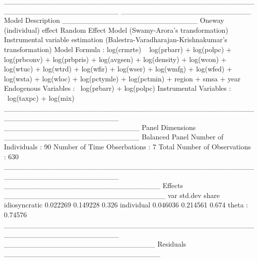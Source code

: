 \documentclass{article}
\begin{document}
\begin{Schunk}
\begin{Soutput}
______________________________________________________________________ 
_________________________ Model Description __________________________
Oneway (individual) effect
Random Effect Model (Swamy-Arora's transformation)
Instrumental variable estimation (Balestra-Varadharajan-Krishnakumar's transformation)
Model Formula             : log(crmrte) ~ log(prbarr) + log(polpc) + 
                                log(prbconv) + log(prbpris) + 
                                log(avgsen) + log(density) + 
                                log(wcon) + log(wtuc) + log(wtrd) + 
                                log(wfir) + log(wser) + log(wmfg) + 
                                log(wfed) + log(wsta) + log(wloc) + 
                                log(pctymle) + log(pctmin) + 
                                region + smsa + year
Endogenous Variables    : ~log(prbarr) + log(polpc)
Instrumental Variables    : ~log(taxpc) + log(mix)
______________________________________________________________________ 
__________________________ Panel Dimensions __________________________
Balanced Panel
Number of Individuals        :  90
Number of Time Obserbations  :  7
Total Number of Observations :  630
______________________________________________________________________ 
______________________________ Effects _______________________________
                   var  std.dev share
idiosyncratic 0.022269 0.149228 0.326
individual    0.046036 0.214561 0.674
theta   :  0.74576  
______________________________________________________________________ 
_____________________________ Residuals ______________________________

\end{Soutput}
\end{Schunk}
\end{document}
